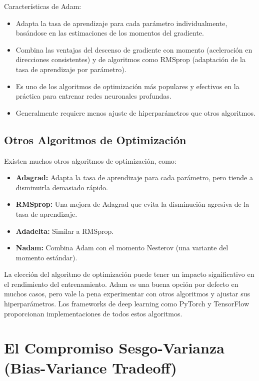 \documentclass{article}
\begin{document}
Características de Adam:

\begin{itemize}
    \item Adapta la tasa de aprendizaje para cada parámetro individualmente, basándose en las estimaciones de los momentos del gradiente.
    \item Combina las ventajas del descenso de gradiente con momento (aceleración en direcciones consistentes) y de algoritmos como RMSprop (adaptación de la tasa de aprendizaje por parámetro).
    \item Es uno de los algoritmos de optimización más populares y efectivos en la práctica para entrenar redes neuronales profundas.
    \item Generalmente requiere menos ajuste de hiperparámetros que otros algoritmos.
\end{itemize}

\subsection{Otros Algoritmos de Optimización}

Existen muchos otros algoritmos de optimización, como:

\begin{itemize}
    \item \textbf{Adagrad:} Adapta la tasa de aprendizaje para cada parámetro, pero tiende a disminuirla demasiado rápido.
    \item \textbf{RMSprop:} Una mejora de Adagrad que evita la disminución agresiva de la tasa de aprendizaje.
    \item \textbf{Adadelta:} Similar a RMSprop.
    \item \textbf{Nadam:}  Combina Adam con el momento Nesterov (una variante del momento estándar).
\end{itemize}

La elección del algoritmo de optimización puede tener un impacto significativo en el rendimiento del entrenamiento.  Adam es una buena opción por defecto en muchos casos, pero vale la pena experimentar con otros algoritmos y ajustar sus hiperparámetros. Los frameworks de deep learning como PyTorch y TensorFlow proporcionan implementaciones de todos estos algoritmos.

\section{El Compromiso Sesgo-Varianza (Bias-Variance Tradeoff)}
\end{document}
